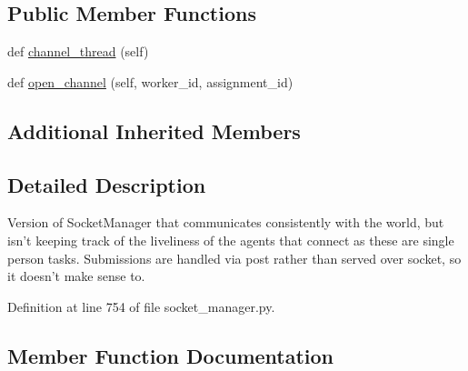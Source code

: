 \subsection*{Public Member Functions}
\begin{DoxyCompactItemize}
\item 
def \hyperlink{classparlai_1_1mturk_1_1core_1_1socket__manager_1_1StaticSocketManager_ac141271b1df6f50a5bfee040d7904696}{channel\+\_\+thread} (self)
\item 
def \hyperlink{classparlai_1_1mturk_1_1core_1_1socket__manager_1_1StaticSocketManager_a4672bc8a07f4ae122338ceb3a59cd54a}{open\+\_\+channel} (self, worker\+\_\+id, assignment\+\_\+id)
\end{DoxyCompactItemize}
\subsection*{Additional Inherited Members}


\subsection{Detailed Description}
\begin{DoxyVerb}Version of SocketManager that communicates consistently with the world,
but isn't keeping track of the liveliness of the agents that connect as
these are single person tasks. Submissions are handled via post rather
than served over socket, so it doesn't make sense to.
\end{DoxyVerb}
 

Definition at line 754 of file socket\+\_\+manager.\+py.



\subsection{Member Function Documentation}
\mbox{\label{classparlai_1_1mturk_1_1core_1_1socket__manager_1_1StaticSocketManager_ac141271b1df6f50a5bfee040d7904696}} 
